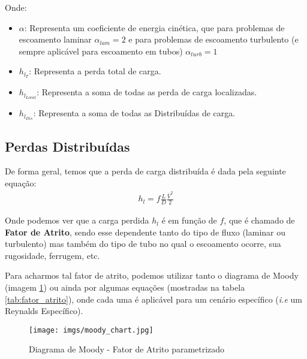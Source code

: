 \documentclass{article}
\begin{document}
Onde:
\begin{itemize}
    \item $\alpha$: Representa um coeficiente de energia cinética, que para problemas de escoamento laminar $\alpha_{lam} = 2$ e para problemas de escoamento turbulento (e sempre aplicável para escoamento em tubos) $\alpha_{turb} = 1$
    \item $h_{l_{T}}$: Representa a perda total de carga.
    \item $h_{l_{Local}}$: Representa a soma de todas as perda de carga localizadas.
    \item $h_{l_{Dis}}$: Representa a soma de todas as Distribuídas de carga.
\end{itemize}

\newpage
\subsection{Perdas Distribuídas}

De forma geral, temos que a perda de carga distribuída é dada pela seguinte equação:
\begin{align}
    h_{l} = f \frac{L}{D}\frac{\bar{V}^2}{2}
    \label{eq:perda_carga_distribuida}
\end{align}

Onde podemos ver que a carga perdida $h_l$ é em função de $f$, que é chamado de \textbf{Fator de Atrito}, sendo esse dependente tanto do tipo de fluxo (laminar ou turbulento) mas também do tipo de tubo no qual o escoamento ocorre, sua rugosidade, ferrugem, etc.

Para acharmos tal fator de atrito, podemos utilizar tanto o diagrama de Moody (imagem \ref{img:moody_chart}) ou ainda por algumas equações (mostradas na tabela \ref{tab:fator_atrito}), onde cada uma é aplicável para um cenário específico (\emph{i.e} um Reynalds Específico).

\begin{figure}[h]
    \centering
    \texttt{[image: imgs/moody\_chart.jpg]}
    \caption{Diagrama de Moody - Fator de Atrito parametrizado}
    \label{img:moody_chart}
\end{figure}
\end{document}
